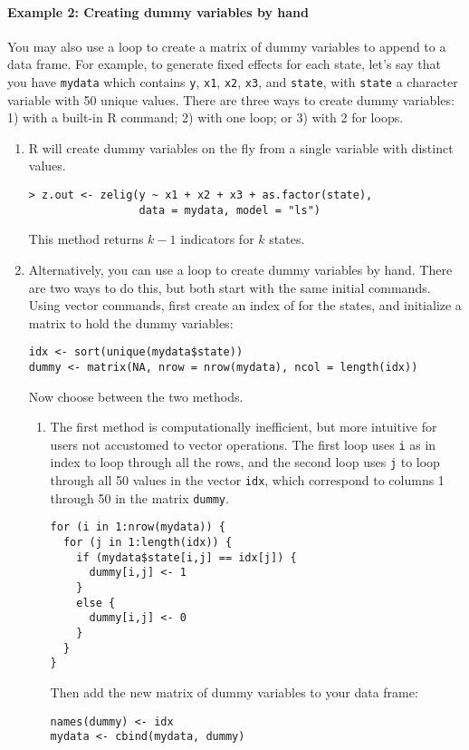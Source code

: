 \paragraph{Example 2: Creating dummy variables by hand}  

\label{dummy}You may also use a loop to create a matrix of dummy
variables to append to a data frame.  For example, to generate fixed
effects for each state, let's say that you have {\tt mydata} which
contains {\tt y}, {\tt x1}, {\tt x2}, {\tt x3}, and {\tt state}, with
{\tt state} a character variable with 50 unique values.  There are
three ways to create dummy variables: 1) with a built-in R command; 2)
with one loop; or 3) with 2 for loops.  
\begin{enumerate}
\item R will create dummy variables on the fly from a single variable
with distinct values.  
\begin{verbatim}
> z.out <- zelig(y ~ x1 + x2 + x3 + as.factor(state), 
                 data = mydata, model = "ls")
\end{verbatim}
This method returns $k - 1$ indicators for $k$ states.  

\item Alternatively, you can use a loop to create dummy variables by
hand.  There are two ways to do this, but both start with the same
initial commands. Using vector commands, first create an index of for
the states, and initialize a matrix to hold the dummy variables:
\begin{verbatim}  
idx <- sort(unique(mydata$state))
dummy <- matrix(NA, nrow = nrow(mydata), ncol = length(idx))
\end{verbatim}
Now choose between the two methods.  
\begin{enumerate}
\item The first method is computationally inefficient, but more intuitive for users not
accustomed to vector operations.  The first loop uses {\tt i} as in
index to loop through all the rows, and the second loop uses {\tt j}
to loop through all 50 values in the vector {\tt idx}, which
correspond to columns 1 through 50 in the matrix {\tt dummy}.
\begin{verbatim}
for (i in 1:nrow(mydata)) {
  for (j in 1:length(idx)) {
    if (mydata$state[i,j] == idx[j]) {
      dummy[i,j] <- 1
    }
    else {
      dummy[i,j] <- 0
    }
  }
}
\end{verbatim}
Then add the new matrix of dummy variables to your data frame:
\begin{verbatim}
names(dummy) <- idx
mydata <- cbind(mydata, dummy) 
\end{verbatim}


\end{enumerate}
\end{enumerate}
